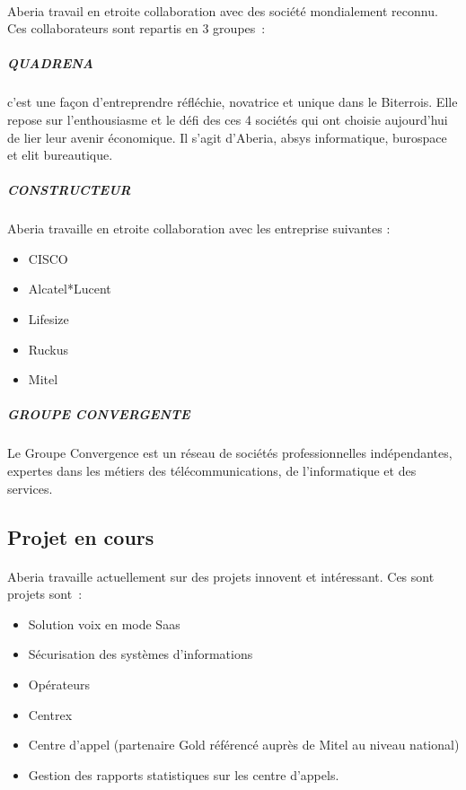 \documentclass[a4paper,12pt]{report}
\begin{document}
\paragraph*{}
Aberia travail en etroite collaboration avec des société mondialement reconnu. \newline Ces collaborateurs sont repartis en 3 groupes : 

\subparagraph{QUADRENA\newline}
      c’est une façon d’entreprendre réfléchie, novatrice et unique dans le Biterrois. Elle repose sur l’enthousiasme et le défi des ces 4 sociétés qui ont choisie aujourd’hui de lier leur avenir économique. 
      Il s’agit d’Aberia, absys informatique, burospace et elit bureautique. 
\subparagraph{CONSTRUCTEUR\newline}
Aberia travaille en etroite collaboration avec les entreprise suivantes : \newline

\begin{itemize}
 \item CISCO
 \item Alcatel*Lucent
 \item Lifesize
 \item Ruckus
 \item Mitel
\end{itemize}

\subparagraph{GROUPE CONVERGENTE\newline}

Le Groupe Convergence est un réseau de sociétés professionnelles indépendantes, expertes dans les métiers des télécommunications, de l’informatique et des services.

\subsection{Projet en cours}
\paragraph*{}
Aberia travaille actuellement sur des projets innovent et intéressant. Ces sont projets sont :

\begin{itemize}
 \item                   Solution voix en mode Saas
                         \item Sécurisation des systèmes d’informations
                        \item  Opérateurs
                      \item Centrex
                        \item Centre d’appel (partenaire Gold référencé auprès de Mitel au niveau national)
                        \item Gestion des rapports statistiques sur les centre d’appels.
\end{itemize}
\end{document}
